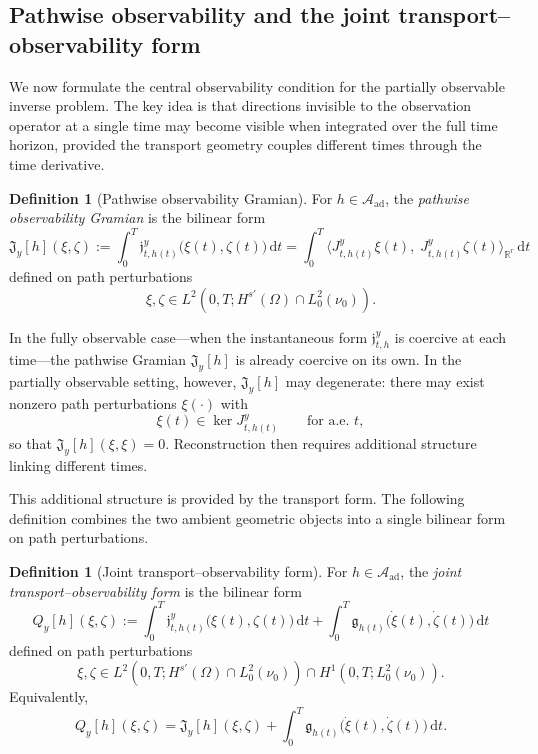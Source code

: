 \documentclass{article}
\theoremstyle{definition}
\newtheorem{definition}[theorem]{Definition}
\renewcommand{\d}{\mathrm{d}}
\begin{document}
\subsection{Pathwise observability and the joint transport--observability form}

We now formulate the central observability condition for the partially observable inverse problem.
The key idea is that directions invisible to the observation operator at a single time may become
visible when integrated over the full time horizon, provided the transport geometry couples
different times through the time derivative.

\begin{definition}[Pathwise observability Gramian]
    \label{def:pathwise-observability-gramian}
    For \(h\in \mathcal A_{\mathrm{ad}}\), the \emph{pathwise observability Gramian} is the bilinear
    form
    \[
        \mathfrak J_y[h](\xi,\zeta)
        :=
        \int_0^T \mathfrak j_{t,h(t)}^{y}\bigl(\xi(t),\zeta(t)\bigr)\,\d t
        =
        \int_0^T \langle J_{t,h(t)}^{y}\xi(t),\;J_{t,h(t)}^{y}\zeta(t)\rangle_{\mathbb R^r}\,\d t
    \]
    defined on path perturbations
    \[
        \xi,\zeta\in L^2(0,T;H^{s'}(\Omega)\cap L^2_0(\nu_0)).
    \]
\end{definition}

In the fully observable case---when the instantaneous form \(\mathfrak j_{t,h}^{y}\) is coercive at
each time---the pathwise Gramian \(\mathfrak J_y[h]\) is already coercive on its own. In the
partially observable setting, however, \(\mathfrak J_y[h]\) may degenerate: there may exist nonzero
path perturbations \(\xi(\cdot)\) with
\[
    \xi(t)\in\ker J_{t,h(t)}^{y}
    \qquad\text{for a.e.\ }t,
\]
so that \(\mathfrak J_y[h](\xi,\xi)=0\). Reconstruction then requires additional structure linking
different times.

This additional structure is provided by the transport form. The following definition combines the
two ambient geometric objects into a single bilinear form on path perturbations.

\begin{definition}[Joint transport--observability form]
    \label{def:joint-transport-observability-form}
    For \(h\in \mathcal A_{\mathrm{ad}}\), the \emph{joint transport--observability form} is the
    bilinear form
    \begin{equation}
        \label{eq:joint-form}
        Q_y[h](\xi,\zeta)
        :=
        \int_0^T \mathfrak j_{t,h(t)}^{y}\bigl(\xi(t),\zeta(t)\bigr)\,\d t
        +
        \int_0^T \mathfrak g_{h(t)}\bigl(\dot\xi(t),\dot\zeta(t)\bigr)\,\d t
    \end{equation}
    defined on path perturbations
    \[
        \xi,\zeta \in L^2(0,T;H^{s'}(\Omega)\cap L^2_0(\nu_0))
        \cap H^1(0,T;L^2_0(\nu_0)).
    \]
    Equivalently,
    \[
        Q_y[h](\xi,\zeta)
        =
        \mathfrak J_y[h](\xi,\zeta)
        +
        \int_0^T \mathfrak g_{h(t)}\bigl(\dot\xi(t),\dot\zeta(t)\bigr)\,\d t.
    \]
\end{definition}
\end{document}
